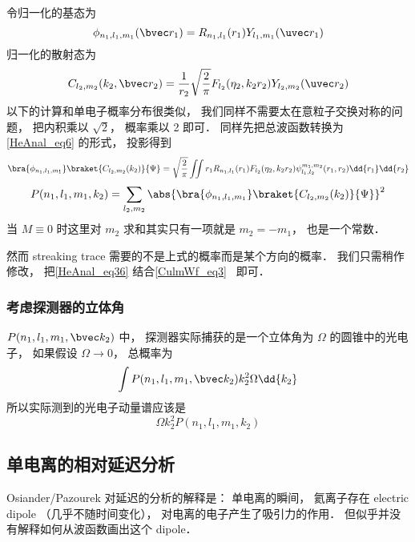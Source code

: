 令归一化的基态为
\begin{equation}
\phi_{n_1, l_1, m_1}(\bvec r_1) = R_{n_1,l_1}(r_1)Y_{l_1,m_1}(\uvec r_1)
\end{equation}
归一化的散射态为
\begin{equation}
C_{l_2, m_2}(k_2, \bvec r_2) = \frac{1}{r_2}\sqrt{\frac{2}{\pi}} F_{l_2}(\eta_2, k_2 r_2) Y_{l_2, m_2} (\uvec r_2)
\end{equation}
以下的计算和单电子概率分布很类似， 我们同样不需要太在意粒子交换对称的问题， 把内积乘以 $\sqrt{2}$， 概率乘以 2 即可． 同样先把总波函数转换为\autoref{HeAnal_eq6} 的形式， 投影得到
\begin{equation}\label{HeAnal_eq36}
\bra{\phi_{n_1, l_1, m_1}}\braket{C_{l_2, m_2}(k_2)}{\Psi} = \sqrt{\frac{2}{\pi}} \iint r_1 R_{n_1,l_1}(r_1) F_{l_2}(\eta_2, k_2 r_2) \psi_{l_1, l_2}^{m_1, m_2}(r_1, r_2) \dd{r_1} \dd{r_2}
\end{equation}
\begin{equation}
P(n_1, l_1, m_1, k_2) = \sum_{l_2, m_2}\abs{\bra{\phi_{n_1, l_1, m_1}}\braket{C_{l_2, m_2}(k_2)}{\Psi}}^2
\end{equation}
当 $M \equiv 0$ 时这里对 $m_2$ 求和其实只有一项就是 $m_2 = - m_1$， 也是一个常数．

然而 streaking trace 需要的不是上式的概率而是某个方向的概率． 我们只需稍作修改， 把\autoref{HeAnal_eq36} 结合\autoref{CulmWf_eq3}~ 即可．

\subsubsection{考虑探测器的立体角}
$P(n_1, l_1, m_1, \bvec k_2)$ 中， 探测器实际捕获的是一个立体角为 $\Omega$ 的圆锥中的光电子， 如果假设 $\Omega \to 0$， 总概率为
\begin{equation}
\int P(n_1, l_1, m_1, \bvec k_2) k_2^2 \Omega \dd{k_2}
\end{equation}
所以实际测到的光电子动量谱应该是
\begin{equation}
\Omega k_2^2 P(n_1, l_1, m_1, k_2)
\end{equation}

\subsection{单电离的相对延迟分析}

Osiander/Pazourek 对延迟的分析的解释是： 单电离的瞬间， 氦离子存在 electric dipole （几乎不随时间变化）， 对电离的电子产生了吸引力的作用． 但似乎并没有解释如何从波函数画出这个 dipole．

